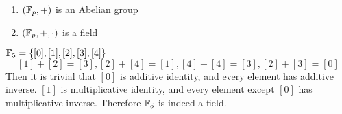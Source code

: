 \begin{lemma}
    \hfill
    \begin{enumerate}
        \item \((\mathbb{F}_p, +)\) is an Abelian group
        \item \((\mathbb{F}_p, +, \cdot)\) is a field
    \end{enumerate}
\end{lemma}

\begin{example}
    \(\mathbb{F}_5 = \{[0], [1], [2], [3], [4]\}\)
    \[
        [1] + [2] = [3], [2] + [4] = [1], [4] + [4] = [3], [2] + [3] = [0]
    \]
    Then it is trivial that \([0]\) is additive identity, and every element has additive inverse. \([1]\) is multiplicative identity, and every element except \([0]\) has multiplicative inverse. Therefore \(\mathbb{F}_5\) is indeed a field.
\end{example}
